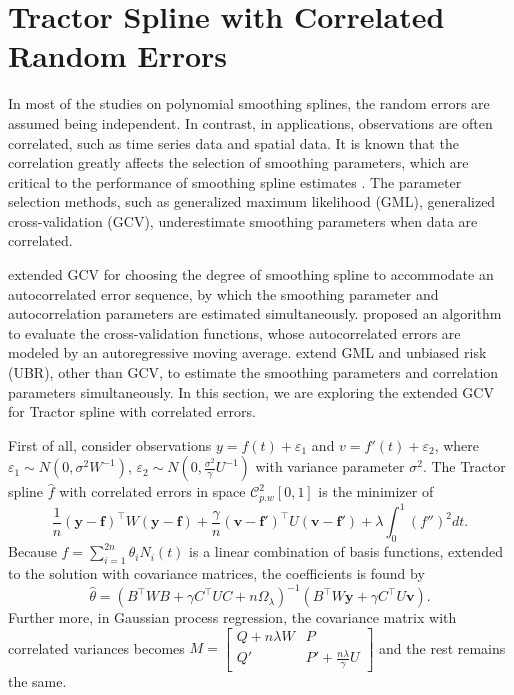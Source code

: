 \section{Tractor Spline with Correlated Random Errors}


In most of the studies on polynomial smoothing splines, the random errors are assumed being independent. In contrast, in applications, observations are often correlated, such as time series data and spatial data. It is known that the correlation greatly affects the selection of smoothing parameters, which are critical to the performance of smoothing spline estimates \cite{wang1998smoothing}.  The parameter selection methods, such as generalized maximum likelihood (GML), generalized cross-validation (GCV), underestimate smoothing parameters when data are correlated. 


\cite{diggle1989spline} extended GCV for choosing the degree of smoothing spline to accommodate an autocorrelated error sequence, by which the smoothing parameter and autocorrelation parameters are estimated simultaneously.  \cite{kohn1992nonparametric} proposed an algorithm to evaluate the cross-validation functions, whose autocorrelated errors are modeled by an autoregressive moving average. \cite{wang1998smoothing} extend GML and unbiased risk (UBR), other than GCV, to estimate the smoothing parameters and correlation parameters simultaneously. In this section, we are exploring the extended GCV for Tractor spline with correlated errors. 


First of all, consider observations $y=f(t)+\varepsilon_1$ and $v=f'(t)+\varepsilon_2$, where $\varepsilon_1\sim N(0,\sigma^2W^{-1})$, $\varepsilon_2\sim N(0,\frac{\sigma^2}{\gamma}U^{-1})$ with variance parameter $\sigma^2$. The Tractor spline $\hat{f}$ with correlated errors in space $\mathcal{C}_{p.w}^2[0,1]$ is the minimizer of 
\begin{equation}
\frac{1}{n}(\mathbf{y}-\mathbf{f})^\top W(\mathbf{y}-\mathbf{f})+\frac{\gamma}{n}(\mathbf{v}-\mathbf{f}')^\top U(\mathbf{v}-\mathbf{f}')+\lambda\int_0^1(f'')^2dt.
\end{equation}
Because $f=\sum_{i=1}^{2n}\theta_iN_i(t)$ is a linear combination of basis functions, extended to the solution with covariance matrices, the coefficients is found by 
\begin{equation}
\hat{\theta}=(B^\top W B+ \gamma C^\top UC+n\Omega_\lambda)^{-1}(B^\top W \mathbf{y}+\gamma C^\top U\mathbf{v}).
\end{equation}
Further more, in Gaussian process regression, the covariance matrix with correlated variances becomes 
$M=\begin{bmatrix}
Q+n\lambda W& P\\
Q'& P'+\frac{n\lambda}{\gamma}U
\end{bmatrix}$ and the rest remains the same. 


